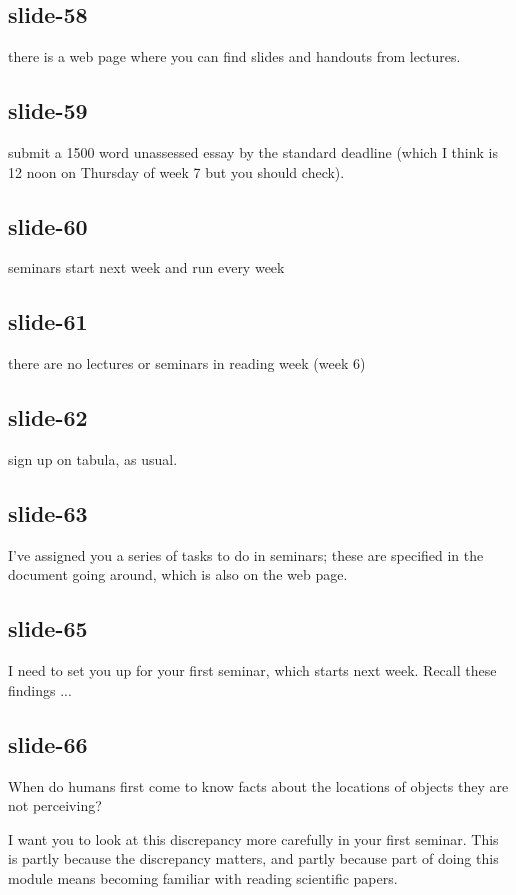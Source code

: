 \documentclass[12pt,\papersize]{extarticle}
\begin{document}
\subsection{slide-58}
there is a web page where you can find slides and handouts from lectures.

\subsection{slide-59}
submit a 1500 word unassessed essay by the standard deadline (which I think is 12 noon on
Thursday of week 7 but you should check).

\subsection{slide-60}
seminars start next week and run every week

\subsection{slide-61}
there are no lectures or seminars in reading week (week 6)

\subsection{slide-62}
sign up on tabula, as usual.

\subsection{slide-63}
I've assigned you a series of tasks to do in seminars; these are specified in the
document going around, which is also on the web page.

\subsection{slide-65}
I need to set you up for your first seminar, which starts next week.
Recall these findings ...

\subsection{slide-66}
When do humans first come to know facts about the locations of objects they are not perceiving?

I want you to look at this discrepancy more carefully in your first seminar.
This is partly because the discrepancy matters, and partly because part of doing this module
means becoming familiar with reading scientific papers.
\end{document}
